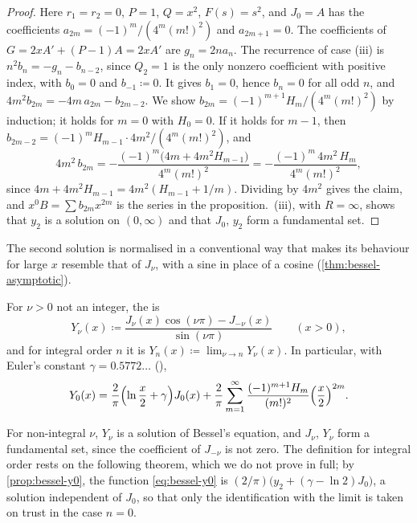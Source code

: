 \begin{proof}
Here $r_1=r_2=0$, $P=1$, $Q=x^2$, $F(s)=s^2$, and $J_0=A$ has the coefficients $a_{2m}=(-1)^m/(4^m(m!)^2)$ and $a_{2m+1}=0$. The coefficients of $G=2xA'+(P-1)A=2xA'$ are $g_n=2na_n$. The recurrence of case (iii) is $n^2b_n=-g_n-b_{n-2}$, since $Q_2=1$ is the only nonzero coefficient with positive index, with $b_0=0$ and $b_{-1}\coloneqq0$. It gives $b_1=0$, hence $b_n=0$ for all odd $n$, and $4m^2b_{2m}=-4m\,a_{2m}-b_{2m-2}$. We show $b_{2m}=(-1)^{m+1}H_m/(4^m(m!)^2)$ by induction; it holds for $m=0$ with $H_0=0$. If it holds for $m-1$, then $b_{2m-2}=(-1)^mH_{m-1}\cdot4m^2/(4^m(m!)^2)$, and
\[
4m^2\,b_{2m}=-\frac{(-1)^m\bigl(4m+4m^2H_{m-1}\bigr)}{4^m(m!)^2}=-\frac{(-1)^m\,4m^2\,H_m}{4^m(m!)^2},
\]
since $4m+4m^2H_{m-1}=4m^2(H_{m-1}+1/m)$. Dividing by $4m^2$ gives the claim, and $x^0B=\sum b_{2m}x^{2m}$ is the series in the proposition. \,(iii), with $R=\infty$, shows that $y_2$ is a solution on $(0,\infty)$ and that $J_0$, $y_2$ form a fundamental set.
\end{proof}

The second solution is normalised in a conventional way that makes its behaviour for large $x$ resemble that of $J_\nu$, with a sine in place of a cosine (\cref{thm:bessel-asymptotic}).

\begin{definition}
\label{def:bessel-y}
For $\nu>0$ not an integer, the  is
\[
Y_\nu(x)\coloneqq\frac{J_\nu(x)\cos(\nu\pi)-J_{-\nu}(x)}{\sin(\nu\pi)}\qquad(x>0),
\]
and for integral order $n$ it is $Y_n(x)\coloneqq\lim_{\nu\to n}Y_\nu(x)$. In particular, with Euler's constant $\gamma=0.5772\ldots$ (),
\begin{equation}
Y_0(x)=\frac2\pi\Bigl(\ln\frac x2+\gamma\Bigr)J_0(x)+\frac2\pi\sum_{m=1}^\infty\frac{(-1)^{m+1}H_m}{(m!)^2}\Bigl(\frac x2\Bigr)^{2m} .
\label{eq:bessel-y0}
\end{equation}
\end{definition}

For non-integral $\nu$, $Y_\nu$ is a solution of Bessel's equation, and $J_\nu$, $Y_\nu$ form a fundamental set, since the coefficient of $J_{-\nu}$ is not zero. The definition for integral order rests on the following theorem, which we do not prove in full; by \cref{prop:bessel-y0}, the function \eqref{eq:bessel-y0} is $(2/\pi)\bigl(y_2+(\gamma-\ln2)J_0\bigr)$, a solution independent of $J_0$, so that only the identification with the limit is taken on trust in the case $n=0$.

